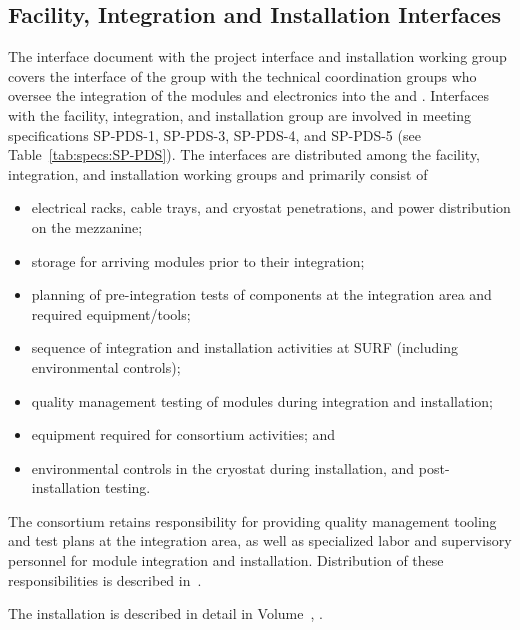 \subsection{Facility, Integration and Installation Interfaces}

The interface document with the project interface and installation working group covers the interface of the  group with the technical coordination groups who oversee the integration of the  modules and electronics into the  and . Interfaces with the facility, integration, and installation group are involved in meeting specifications SP-PDS-1, SP-PDS-3, SP-PDS-4, and SP-PDS-5 (see Table~\ref{tab:specs:SP-PDS}).  The interfaces are distributed among the facility, integration, and installation working groups and primarily consist of
\begin{itemize}
    \item electrical racks, cable trays, and cryostat penetrations, and power distribution on the mezzanine;
    \item storage for arriving  modules prior to their integration;
    \item planning of pre-integration tests of  components at the integration area and required equipment/tools;
    \item sequence of integration and installation activities at SURF (including environmental controls);
    \item quality management testing of  modules during integration and installation;
    \item equipment required for  consortium activities; and
    \item environmental controls in the cryostat during installation, and post-installation testing.
\end{itemize}

The  consortium retains responsibility for providing quality management tooling and test plans at the integration area, as well as specialized labor and supervisory personnel for  module integration and installation. Distribution of these responsibilities is described in~. %

The installation is described in detail in 
Volume~\volnumbertc{}, \voltitletc{}.


